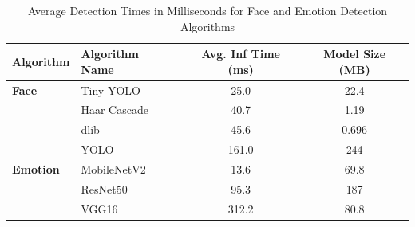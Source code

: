 \begin{table}[h!]
\centering{}
\caption{Average Detection Times in Milliseconds for Face and Emotion Detection Algorithms}
\begin{tabular}{|l|l|c|c|}
\hline
\textbf{Algorithm} & \textbf{Algorithm Name} & \textbf{Avg. Inf Time (ms)} & \textbf{Model Size (MB)}\\ \hline
\textbf{Face} & Tiny YOLO               & 25.0    &   22.4                                            \\ \cline{2-4}
                        & Haar Cascade            & 40.7    &   1.19                    \\ \cline{2-4}
                        & dlib                    & 45.6    &   0.696                   \\ \cline{2-4}
                        & YOLO                    & 161.0   &   244                     \\ \hline
\textbf{Emotion} & MobileNetV2          & 13.6    &   69.8                                            \\ \cline{2-4}
                        & ResNet50                & 95.3    &   187                      \\ \cline{2-4}
                        & VGG16                   & 312.2   &   80.8                     \\ \hline
\end{tabular}
\label{tab:algorithm_detection_times_ms}
\end{table}


